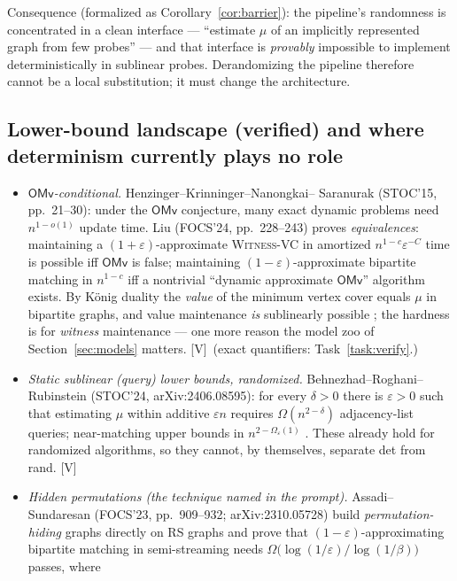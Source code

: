 \documentclass[11pt]{article}
\theoremstyle{definition}
\theoremstyle{remark}
\newcommand{\statusV}{\textcolor{green!45!black}{\textsf{[V]}}}
\newcommand{\OMv}{\mathsf{OMv}}
\newcommand{\eps}{\varepsilon}
\newcommand{\mm}{\mu}
\begin{document}
Consequence (formalized as Corollary~\ref{cor:barrier}): the pipeline's
randomness is concentrated in a clean interface --- ``estimate
$\mm$ of an implicitly represented graph from few probes'' --- and that
interface is \emph{provably} impossible to implement deterministically
in sublinear probes. Derandomizing the pipeline therefore cannot be a
local substitution; it must change the architecture.

\subsection{Lower-bound landscape (verified) and where determinism
currently plays no role}
\label{sec:lb-landscape}

\begin{itemize}[itemsep=3pt]
\item \emph{$\OMv$-conditional.} Henzinger--Krinninger--Nanongkai--%
Saranurak \cite{HKNS15} (STOC'15, pp.~21--30): under the $\OMv$
conjecture, many exact dynamic problems need $n^{1-o(1)}$ update time.
Liu \cite{Liu24} (FOCS'24, pp.~228--243) proves \emph{equivalences}:
maintaining a $(1+\eps)$-approximate \textsc{Witness-VC} in amortized
$n^{1-c}\eps^{-C}$ time is possible iff $\OMv$ is false; maintaining
$(1-\eps)$-approximate bipartite matching in $n^{1-c}$ iff a nontrivial
``dynamic approximate $\OMv$'' algorithm exists. By K\"onig duality the
\emph{value} of the minimum vertex cover equals $\mm$ in bipartite
graphs, and value maintenance \emph{is} sublinearly possible
\cite{BKS23}; the hardness is for \emph{witness} maintenance --- one
more reason the model zoo of Section~\ref{sec:models} matters. \statusV\
(exact quantifiers: Task~\ref{task:verify}.)
\item \emph{Static sublinear (query) lower bounds, randomized.}
Behnezhad--Roghani--Rubinstein \cite{BRR24} (STOC'24, arXiv:2406.08595):
for every $\delta>0$ there is $\eps>0$ such that estimating $\mm$ within
additive $\eps n$ requires $\Omega(n^{2-\delta})$ adjacency-list
queries; near-matching upper bounds in $n^{2-\Omega_{\eps}(1)}$
\cite{BKS23,BRRS23}. These already hold for randomized algorithms, so
they cannot, by themselves, separate det from rand. \statusV
\item \emph{Hidden permutations (the technique named in the prompt).}
Assadi--Sundaresan \cite{AS23} (FOCS'23, pp.~909--932; arXiv:2310.05728)
build \emph{permutation-hiding} graphs directly on RS graphs and prove
that $(1-\eps)$-approximating bipartite matching in semi-streaming needs
$\Omega\!\big(\log(1/\eps)/\log(1/\beta)\big)$ passes, where

\end{itemize}
\end{document}
